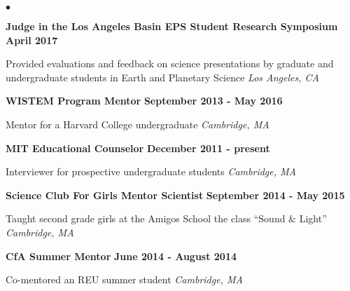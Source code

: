 \documentclass[margin,line]{res}
\newenvironment{list1}{
  \begin{list}{\ding{113}}{%
      \setlength{\itemsep}{0in}
      \setlength{\parsep}{0in} \setlength{\parskip}{0in}
      \setlength{\topsep}{0in} \setlength{\partopsep}{0in} 
      \setlength{\leftmargin}{0.17in}}}{\end{list}}
\newenvironment{list2}{
  \begin{list}{$\bullet$}{%
      \setlength{\itemsep}{0in}
      \setlength{\parsep}{0in} \setlength{\parskip}{0in}
      \setlength{\topsep}{0in} \setlength{\partopsep}{0in} 
      \setlength{\leftmargin}{0.2in}}}{\end{list}}
\begin{document}
\begin{resume}
\begin{list2}
\vspace{0.2in}

\item[] {\bf Judge in the Los Angeles Basin EPS Student Research Symposium } \hfill {\bf April 2017}
\begin{list1}
\item[] Provided evaluations and feedback on science presentations by graduate and undergraduate students in Earth and Planetary Science \hfill \textit{Los Angeles, CA}
\end{list1}

\vspace{0.2in}

\item[] {\bf WISTEM Program Mentor} \hfill {\bf September 2013 - May 2016}
\begin{list1}
\item[] Mentor for a Harvard College undergraduate \hfill \textit{Cambridge, MA}
\end{list1}

\vspace{0.2in}

\item[] {\bf MIT Educational Counselor} \hfill {\bf December 2011 - present}
\begin{list1}
\item[] Interviewer for prospective undergraduate students \hfill \textit{Cambridge, MA}
\end{list1}

\vspace{0.2in}

\item[] {\bf Science Club For Girls Mentor Scientist} \hfill { \bf September 2014 - May 2015}
\begin{list1}
\item[] Taught second grade girls at the Amigos School the class ``Sound \& Light'' \hfill \textit{Cambridge, MA}
\end{list1}



\vspace{0.2in}

\item[] {\bf CfA Summer Mentor} \hfill {\bf June 2014 - August 2014}
\begin{list1}
\item[] Co-mentored an REU summer student \hfill \textit{Cambridge, MA}
\end{list1}

\vspace{0.2in}


\end{list2}
\end{resume}
\end{document}
